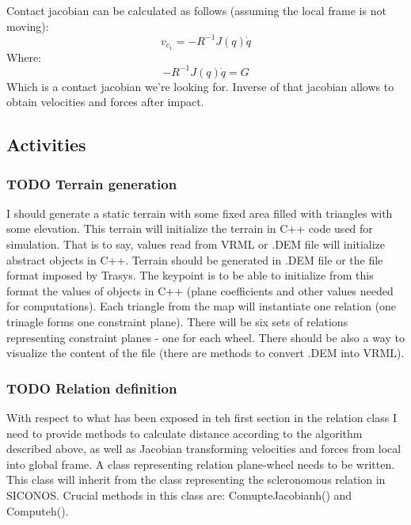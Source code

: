 \documentclass[11pt]{article}
\begin{document}
    Contact jacobian can be calculated as follows (assuming the local frame is not moving):
    \begin{equation}
    v_{c_{1}} = -R^{-1}J(q)\dot{q}
    \end{equation}
    Where:
    \begin{equation}
    -R^{-1}J(q)\dot{q} = G
    \end{equation}
    Which is a contact jacobian we're looking for. Inverse of that jacobian allows to obtain
    velocities and forces after impact.
    
\subsection{Activities}
\label{sec-2.3}


\subsubsection{\textbf{TODO} Terrain generation}
\label{sec-2.3.1}


    I should generate a static terrain with some fixed area filled with triangles with some 
    elevation. This terrain will initialize the terrain in C++ code used for simulation.
    That is to say, values read from VRML or .DEM file will initialize abstract objects in
    C++. Terrain should be generated in .DEM file or the file format imposed by Trasys. 
    The keypoint is to be able to initialize from this format the values of objects in C++
    (plane coefficients and other values needed for computations).
    Each triangle from the map will instantiate one relation (one trinagle forms one constraint
    plane). There will be six sets of relations representing constraint planes - one for
    each wheel.
    There should be also a way to visualize the content of the file
    (there are methods to convert .DEM into VRML).
    
\subsubsection{\textbf{TODO} Relation definition}
\label{sec-2.3.2}


    With respect to what has been exposed in teh first section in the relation class I need
    to provide methods to calculate distance according to the algorithm described above, as
    well as Jacobian transforming velocities and forces from local into global frame.
    A class representing relation plane-wheel needs to be written. This class will inherit
    from the class representing the scleronomous relation in SICONOS. Crucial methods in this
    class are: ComupteJacobianh() and Computeh().
\end{document}
